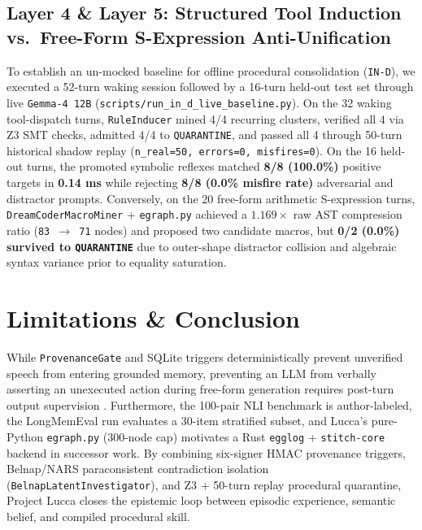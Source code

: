 \documentclass[11pt,a4paper]{article}
\begin{document}
\subsection{Layer 4 \& Layer 5: Structured Tool Induction vs.\ Free-Form S-Expression Anti-Unification}
To establish an un-mocked baseline for offline procedural consolidation (\texttt{IN-D}), we executed a 52-turn waking session followed by a 16-turn held-out test set through live \texttt{Gemma-4 12B} (\texttt{scripts/run\_in\_d\_live\_baseline.py}). On the 32 waking tool-dispatch turns, \texttt{RuleInducer} mined 4/4 recurring clusters, verified all 4 via Z3 SMT checks, admitted 4/4 to \texttt{QUARANTINE}, and passed all 4 through 50-turn historical shadow replay (\texttt{n\_real=50, errors=0, misfires=0}). On the 16 held-out turns, the promoted symbolic reflexes matched \textbf{8/8 (100.0\%)} positive targets in \textbf{0.14 ms} while rejecting \textbf{8/8 (0.0\% misfire rate)} adversarial and distractor prompts. Conversely, on the 20 free-form arithmetic S-expression turns, \texttt{DreamCoderMacroMiner} + \texttt{egraph.py} achieved a $1.169\times$ raw AST compression ratio (\texttt{83 $\to$ 71} nodes) and proposed two candidate macros, but \textbf{0/2 (0.0\%) survived to \texttt{QUARANTINE}} due to outer-shape distractor collision and algebraic syntax variance prior to equality saturation.

\section{Limitations \& Conclusion}
While \texttt{ProvenanceGate} and SQLite triggers deterministically prevent unverified speech from entering grounded memory, preventing an LLM from verbally asserting an unexecuted action during free-form generation requires post-turn output supervision \cite{maxwell2026}. Furthermore, the 100-pair NLI benchmark is author-labeled, the LongMemEval run evaluates a 30-item stratified subset, and Lucca's pure-Python \texttt{egraph.py} (300-node cap) motivates a Rust \texttt{egglog} + \texttt{stitch-core} backend in successor work. By combining six-signer HMAC provenance triggers, Belnap/NARS paraconsistent contradiction isolation (\texttt{BelnapLatentInvestigator}), and Z3 + 50-turn replay procedural quarantine, Project Lucca closes the epistemic loop between episodic experience, semantic belief, and compiled procedural skill.
\end{document}
